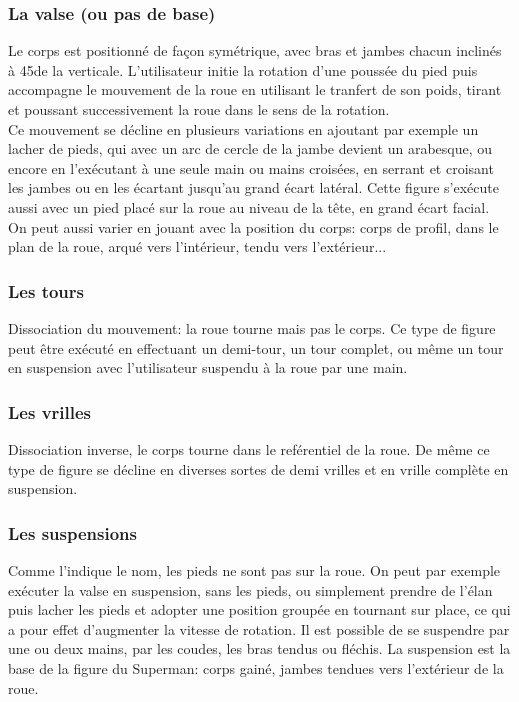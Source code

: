 \subsubsection{La valse (ou pas de base)}
Le corps est positionné de façon symétrique, avec bras et jambes chacun inclinés à 45\degree de la verticale. L'utilisateur initie la rotation d'une poussée du pied puis accompagne le mouvement de la roue en utilisant le tranfert de son poids, tirant et poussant successivement la roue dans le sens de la rotation.\\
Ce mouvement se décline en plusieurs variations en ajoutant par exemple un lacher de pieds, qui avec un arc de cercle de la jambe devient un arabesque, ou encore en l'exécutant à une seule main ou mains croisées, en serrant et croisant les jambes ou en les écartant jusqu'au grand écart latéral. Cette figure s'exécute aussi avec un pied placé sur la roue au niveau de la tête, en grand écart facial. On peut aussi varier en jouant avec la position du corps: corps de profil, dans le plan de la roue, arqué vers l'intérieur, tendu vers l'extérieur...

\subsubsection{Les tours}
Dissociation du mouvement: la roue tourne mais pas le corps. Ce type de figure peut être exécuté en effectuant un demi-tour, un tour complet, ou même un tour en suspension avec l'utilisateur suspendu à la roue par une main.

\subsubsection{Les vrilles}
Dissociation inverse, le corps tourne dans le reférentiel de la roue. De même ce type de figure se décline en diverses sortes de demi vrilles et en vrille complète en suspension.

\subsubsection{Les suspensions}
Comme l'indique le nom, les pieds ne sont pas sur la roue. On peut par exemple exécuter la valse en suspension, sans les pieds, ou simplement prendre de l'élan puis lacher les pieds et adopter une position groupée en tournant sur place, ce qui a pour effet d'augmenter la vitesse de rotation. Il est possible de se suspendre par une ou deux mains, par les coudes, les bras tendus ou fléchis. La suspension est la base de la figure du Superman: corps gainé, jambes tendues vers l'extérieur de la roue.

